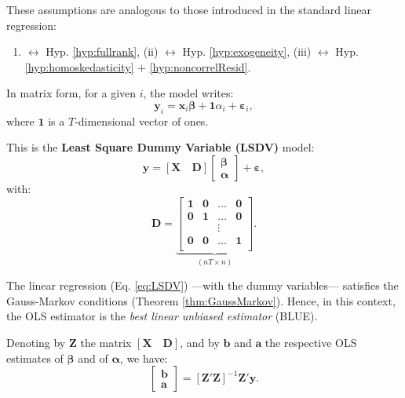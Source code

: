 \documentclass[
  12pt,
]{book}
\providecommand{\tightlist}{%
  \setlength{\itemsep}{0pt}\setlength{\parskip}{0pt}}
\theoremstyle{definition}
\theoremstyle{definition}
\theoremstyle{definition}
\theoremstyle{definition}
\theoremstyle{remark}
\begin{document}
These assumptions are analogous to those introduced in the standard linear regression:

\begin{enumerate}
\def\labelenumi{(\roman{enumi})}
\tightlist
\item
  \(\leftrightarrow\) Hyp. \ref{hyp:fullrank}, (ii) \(\leftrightarrow\) Hyp. \ref{hyp:exogeneity}, (iii) \(\leftrightarrow\) Hyp. \ref{hyp:homoskedasticity} + \ref{hyp:noncorrelResid}.
\end{enumerate}

In matrix form, for a given \(i\), the model writes:
\[
\mathbf{y}_i = \mathbf{x}_i \boldsymbol\beta + \mathbf{1}\alpha_i + \boldsymbol\varepsilon_i,
\]
where \(\mathbf{1}\) is a \(T\)-dimensional vector of ones.

This is the \textbf{Least Square Dummy Variable (LSDV)} model:
\begin{equation}
\mathbf{y} = [\mathbf{X} \quad \mathbf{D}]
\left[
\begin{array}{c}
\boldsymbol\beta\\
\boldsymbol\alpha
\end{array}
\right]
+ \boldsymbol\varepsilon, \label{eq:LSDV}
\end{equation}
with:
\[
\mathbf{D} = \underbrace{ \left[\begin{array}{cccc}
\mathbf{1}&\mathbf{0}&\dots&\mathbf{0}\\
\mathbf{0}&\mathbf{1}&\dots&\mathbf{0}\\
&&\vdots&\\
\mathbf{0}&\mathbf{0}&\dots&\mathbf{1}\\
\end{array}\right]}_{(nT \times n)}.
\]

The linear regression (Eq. \eqref{eq:LSDV}) ---with the dummy variables--- satisfies the Gauss-Markov conditions (Theorem \ref{thm:GaussMarkov}). Hence, in this context, the OLS estimator is the \emph{best linear unbiased estimator} (BLUE).

Denoting by \(\mathbf{Z}\) the matrix \([\mathbf{X} \quad \mathbf{D}]\), and by \(\mathbf{b}\) and \(\mathbf{a}\) the respective OLS estimates of \(\boldsymbol\beta\) and of \(\boldsymbol\alpha\), we have:
\begin{equation}
\boxed{
\left[
\begin{array}{c}
\mathbf{b}\\
\mathbf{a}
\end{array}
\right]
= [\mathbf{Z}'\mathbf{Z}]^{-1}\mathbf{Z}'\mathbf{y}.} \label{eq:bfixedeffects11}
\end{equation}
\end{document}
